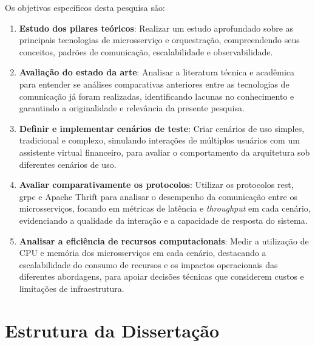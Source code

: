 Os objetivos específicos desta pesquisa são:
\begin{enumerate}
\item \textbf{Estudo dos pilares teóricos}: Realizar um estudo aprofundado sobre as principais tecnologias de microsserviço e orquestração, compreendendo seus conceitos, padrões de comunicação, escalabilidade e observabilidade.
\item \textbf{Avaliação do estado da arte}: Analisar a literatura técnica e acadêmica para entender se análises comparativas anteriores entre as tecnologias de comunicação já foram realizadas, identificando lacunas no conhecimento e garantindo a originalidade e relevância da presente pesquisa.
\item \textbf{Definir e implementar cenários de teste}: Criar cenários de uso simples, tradicional e complexo, simulando interações de múltiplos usuários com um assistente virtual financeiro, para avaliar o comportamento da arquitetura sob diferentes cenários de uso.
\item \textbf{Avaliar comparativamente os protocolos}: Utilizar os protocolos \gls{rest}, \gls{grpc} e Apache Thrift para analisar o desempenho da comunicação entre os microsserviços, focando em métricas de latência e \textit{throughput} em cada cenário, evidenciando a qualidade da interação e a capacidade de resposta do sistema.

\item \textbf{Analisar a eficiência de recursos computacionais}: Medir a utilização de CPU e memória dos microsserviços em cada cenário, destacando a escalabilidade do consumo de recursos e os impactos operacionais das diferentes abordagens, para apoiar decisões técnicas que considerem custos e limitações de infraestrutura.
\end{enumerate}

\section{Estrutura da Dissertação}

